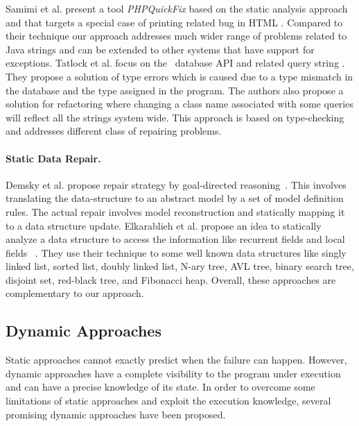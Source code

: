 Samimi et al. present a tool \textit{PHPQuickFix} based on the static analysis approach and that
targets a special case of printing related bug in HTML \cite{SamirniSAMTH12}. Compared to their technique our
approach addresses much wider range of problems related to Java strings and can be extended to
other systems that have support for exceptions.
Tatlock et al. focus on the \java\ database API and related query string
\cite{Tatlock:2008}. They
propose a solution of type errors which is caused due to a type mismatch in
the database and the type assigned in the program. The authors also propose a
solution for refactoring where changing a class name associated with some
queries will reflect all the strings system wide. This approach is based on type-checking
and addresses different class of repairing problems.

\paragraph{Static Data Repair.}
Demsky et al. propose repair strategy by goal-directed reasoning~\cite{conf/icse/DemskyR05}. This involves
translating the data-structure to an abstract model by a set of model definition
rules. The actual repair involves model reconstruction and statically mapping it
to a data structure update. Elkarablieh et al. propose an idea to statically analyze a data structure to
access the information like recurrent fields and local fields ~\cite{conf/oopsla/2007}. They use their
technique to some well known data structures like singly linked list, sorted
list, doubly linked list, N-ary tree, AVL tree, binary search tree, disjoint set,
red-black tree, and Fibonacci heap. Overall, these approaches are complementary to
our approach. 

\subsection{Dynamic Approaches}
Static approaches cannot exactly predict when the failure can happen. However,
dynamic approaches have a complete visibility to the program under execution and can
have a precise knowledge of its state. In order to overcome some limitations of static approaches
and exploit the execution knowledge, several promising dynamic approaches have
been proposed.
